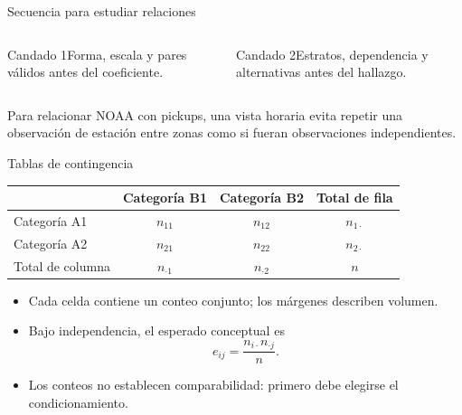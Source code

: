\documentclass[aspectratio=169,11pt]{beamer}
\newcommand{\br}{\\}
\begin{document}
\begin{frame}{Secuencia para estudiar relaciones}
  \footnotesize
  \centering
  \vspace{.7em}
  \begin{columns}[T]
      \begin{block}{Candado 1}Forma, escala y pares válidos antes del coeficiente.\end{block}
      \begin{block}{Candado 2}Estratos, dependencia y alternativas antes del hallazgo.\end{block}
  \end{columns}
  \vfill
  Para relacionar NOAA con pickups, una vista horaria evita repetir una observación de estación entre zonas como si fueran observaciones independientes.
\end{frame}

\begin{frame}{Tablas de contingencia}
  \small
  \begin{tabular}{lccc}
    \toprule
     & Categoría B1 & Categoría B2 & Total de fila \\
    \midrule
    Categoría A1 & $n_{11}$ & $n_{12}$ & $n_{1\cdot}$ \\
    Categoría A2 & $n_{21}$ & $n_{22}$ & $n_{2\cdot}$ \\
    Total de columna & $n_{\cdot1}$ & $n_{\cdot2}$ & $n$ \\
    \bottomrule
  \end{tabular}
  \vspace{.8em}
  \begin{itemize}
    \item Cada celda contiene un conteo conjunto; los márgenes describen volumen.
    \item Bajo independencia, el esperado conceptual es
      \[
        e_{ij}=\frac{n_{i\cdot}n_{\cdot j}}{n}.
      \]
    \item Los conteos no establecen comparabilidad: primero debe elegirse el condicionamiento.
  \end{itemize}
\end{frame}
\end{document}
